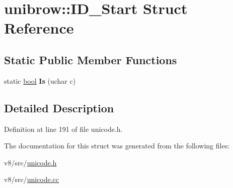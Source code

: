 \hypertarget{structunibrow_1_1ID__Start}{}\section{unibrow\+:\+:I\+D\+\_\+\+Start Struct Reference}
\label{structunibrow_1_1ID__Start}
\subsection*{Static Public Member Functions}
\begin{DoxyCompactItemize}
\item 
\mbox{\label{structunibrow_1_1ID__Start_abb1d92d34c8fa940fe7bd9ab18cb1656}} 
static \mbox{\hyperlink{classbool}{bool}} {\bfseries Is} (uchar c)
\end{DoxyCompactItemize}


\subsection{Detailed Description}


Definition at line 191 of file unicode.\+h.



The documentation for this struct was generated from the following files\+:\begin{DoxyCompactItemize}
\item 
v8/src/\mbox{\hyperlink{unicode_8h}{unicode.\+h}}\item 
v8/src/\mbox{\hyperlink{unicode_8cc}{unicode.\+cc}}\end{DoxyCompactItemize}
